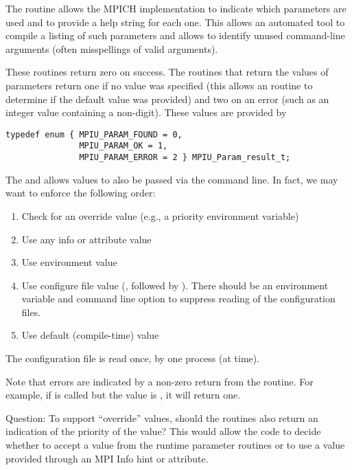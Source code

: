 \documentclass{article}
\begin{document}
The routine  allows the MPICH implementation to
indicate which parameters are used and to provide a help string for each one.
This allows an automated tool to compile a listing of such parameters and
allows  to identify unused command-line arguments
(often misspellings of valid arguments).

These routines return zero on success.  The routines that return the values of
parameters return one if no value was specified (this allows an routine to
determine if the default value was provided) and two on an error (such as an
integer value containing a non-digit).  These values are provided by
\begin{verbatim}
typedef enum { MPIU_PARAM_FOUND = 0, 
               MPIU_PARAM_OK = 1, 
               MPIU_PARAM_ERROR = 2 } MPIU_Param_result_t;
\end{verbatim}

The  and  allows
values to also be passed via the command line.  
In fact, we may want to enforce the following order:
\begin{enumerate}
\item Check for an override value (e.g., a priority environment variable)
\item Use any info or attribute value
\item Use environment value
\item Use configure file value (, followed by
  ).  There should be an environment variable and command
  line option to suppress reading of the configuration files.
\item Use default (compile-time) value
\end{enumerate}
The configuration file is read once, by one process (at
 time).  

Note that errors are indicated by a non-zero return from the routine.
For example, if  is called but the value
is , it will return one.

Question: To support ``override'' values, should the routines also
return an indication of the priority of the value?  This would allow
the code to decide whether to accept a value from the runtime
parameter routines or to use a value provided through an MPI Info hint
or attribute.
\end{document}
